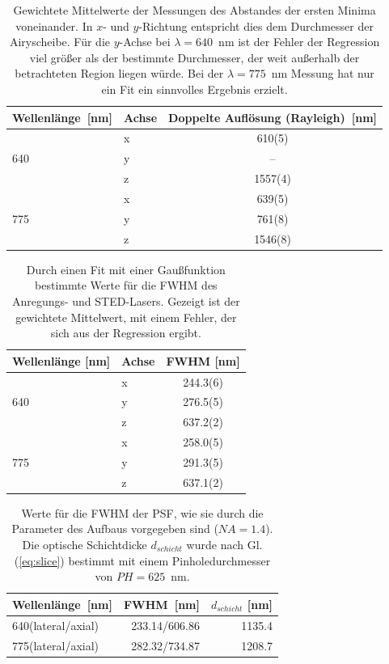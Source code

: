 \begin{table}
	\centering
	\caption{
		Gewichtete Mittelwerte der Messungen des Abstandes der ersten Minima voneinander. In $x$- und $y$-Richtung entspricht dies dem Durchmesser der Airyscheibe.
Für die $y$-Achse bei $\lambda = 640$~nm ist der Fehler der Regression viel größer als der bestimmte Durchmesser, der weit außerhalb der betrachteten Region liegen würde.
Bei der $\lambda = 775$~nm Messung hat nur ein Fit ein sinnvolles Ergebnis erzielt.}
	\begin{tabular}{l|l|c}
		Wellenlänge~[nm] & Achse & Doppelte Auflösung (Rayleigh)~[nm] \\ \hline 
		    &x&610(5)\\
		 640&y&--\\ 
		    &z&1557(4)\\ \hline
		    &x&639(5)\\
		 775&y&761(8)\\
		    &z&1546(8)\\
	\end{tabular}\label{tab:psffits}
\end{table}
\begin{table}
\centering
\caption{Durch einen Fit mit einer Gaußfunktion bestimmte Werte für die FWHM des Anregungs- und STED-Lasers. Gezeigt ist der gewichtete Mittelwert, mit einem Fehler, der sich aus der Regression ergibt.}\label{tab:psffwhm}
\begin{tabular}{l|l|c}
	Wellenlänge [nm]& Achse & FWHM [nm] \\ \hline
	   &x&244.3(6)\\
	640&y&276.5(5)\\
	   &z&637.2(2)\\ \hline
	   &x&258.0(5)\\
	775&y&291.3(5)\\
	   &z&637.1(2)\\
\end{tabular}
\end{table}
\begin{table}
	\centering
	\caption{Werte für die FWHM der PSF, wie sie durch die Parameter des Aufbaus vorgegeben sind ($NA=1.4$). Die optische Schichtdicke $d_{schicht}$ wurde nach Gl. (\ref{eq:slice}) bestimmt mit einem Pinholedurchmesser von $PH = 625$~nm.}\label{tab:fwhmaufbau}
	\begin{tabular}{l|rr}
		Wellenlänge~[nm] & FWHM~[nm] & $d_{schicht}$ [nm]\\ \hline
		640(lateral/axial) & 233.14/606.86 & 1135.4\\
		775(lateral/axial) & 282.32/734.87 & 1208.7
	\end{tabular}
\end{table}

